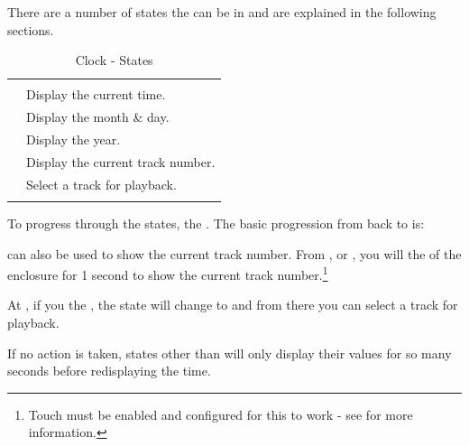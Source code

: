 There are a number of states the  can be in and are explained in the
following sections.

\begin{table}[H]
\centering
\begin{tabu} { X[1,c,m] | X[3,l,m] }
  \thrule
   &  \\ \mrule
   & Display the current time. \\ 
   & Display the month \& day. \\ 
   & Display the year.  \\ 
   & Display the current track number. \\ 
   & Select a track for playback. \\
  \bhrule
\end{tabu}
\caption{Clock - States}
\end{table}

To progress through the states,  the .  The basic progression from
 back to  is:


 can also be used to show the current track number.  From ,
 or , you will  the  of the enclosure for
\num{1} second to show the current track number.\footnote{ Touch must be enabled
and configured for this to work - see \hyperref[Touch Settings]{} for
more information.}


At , if you  the , the state will change to  and
from there you can select a track for playback.


If no action is taken, states other than  will only display their
values for so many seconds before redisplaying the time.


